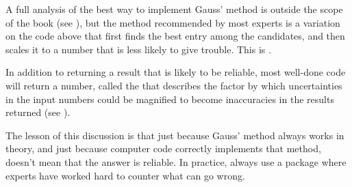 A full analysis of the best way to implement Gauss' method 
is outside the scope of the book (see \cite{Wilkinson65}),
but the method recommended by most experts 
is a variation on the code above that first finds the best entry
among the candidates, and then scales it to a number that is less
likely to give trouble.
This is 
.

In addition to returning a result that is likely to be reliable,
most well-done code will return a number, called the 
%
that describes the factor by which uncertainties in the input numbers
could be magnified to become inaccuracies in the results returned 
(see \cite{Rice}).

The lesson of this discussion is that
just because Gauss' method always works in theory, and just
because computer code correctly implements that method,
doesn't mean that the answer is reliable.
In practice, always use a package
where experts have worked hard to counter what can go wrong.

